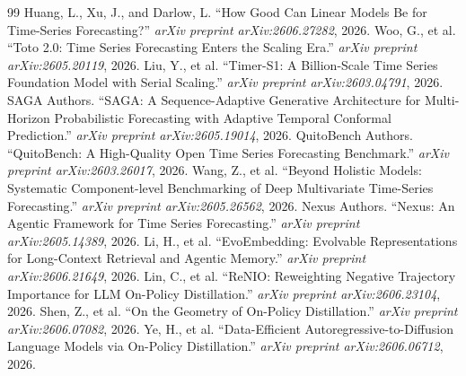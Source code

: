 \documentclass[11pt,a4paper]{article}
\begin{document}
\begin{thebibliography}{99}
 Huang, L., Xu, J., and Darlow, L. ``How Good Can Linear Models Be for Time-Series Forecasting?'' \emph{arXiv preprint arXiv:2606.27282}, 2026.
 Woo, G., et al. ``Toto 2.0: Time Series Forecasting Enters the Scaling Era.'' \emph{arXiv preprint arXiv:2605.20119}, 2026.
 Liu, Y., et al. ``Timer-S1: A Billion-Scale Time Series Foundation Model with Serial Scaling.'' \emph{arXiv preprint arXiv:2603.04791}, 2026.
 SAGA Authors. ``SAGA: A Sequence-Adaptive Generative Architecture for Multi-Horizon Probabilistic Forecasting with Adaptive Temporal Conformal Prediction.'' \emph{arXiv preprint arXiv:2605.19014}, 2026.
 QuitoBench Authors. ``QuitoBench: A High-Quality Open Time Series Forecasting Benchmark.'' \emph{arXiv preprint arXiv:2603.26017}, 2026.
 Wang, Z., et al. ``Beyond Holistic Models: Systematic Component-level Benchmarking of Deep Multivariate Time-Series Forecasting.'' \emph{arXiv preprint arXiv:2605.26562}, 2026.
 Nexus Authors. ``Nexus: An Agentic Framework for Time Series Forecasting.'' \emph{arXiv preprint arXiv:2605.14389}, 2026.
 Li, H., et al. ``EvoEmbedding: Evolvable Representations for Long-Context Retrieval and Agentic Memory.'' \emph{arXiv preprint arXiv:2606.21649}, 2026.
 Lin, C., et al. ``ReNIO: Reweighting Negative Trajectory Importance for LLM On-Policy Distillation.'' \emph{arXiv preprint arXiv:2606.23104}, 2026.
 Shen, Z., et al. ``On the Geometry of On-Policy Distillation.'' \emph{arXiv preprint arXiv:2606.07082}, 2026.
 Ye, H., et al. ``Data-Efficient Autoregressive-to-Diffusion Language Models via On-Policy Distillation.'' \emph{arXiv preprint arXiv:2606.06712}, 2026.
\end{thebibliography}
\end{document}
